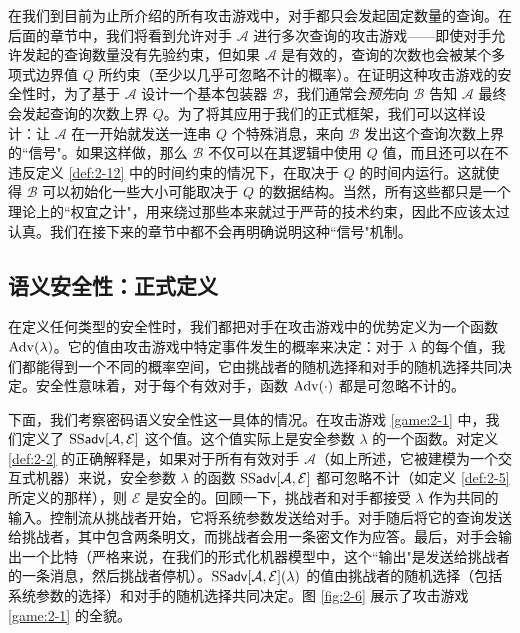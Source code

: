 \begin{snote}[查询有界的对手。]
在我们到目前为止所介绍的所有攻击游戏中，对手都只会发起固定数量的查询。在后面的章节中，我们将看到允许对手 $\mathcal{A}$ 进行多次查询的攻击游戏——即使对手允许发起的查询数量没有先验约束，但如果 $\mathcal{A}$ 是有效的，查询的次数也会被某个多项式边界值 $Q$ 所约束（至少以几乎可忽略不计的概率）。在证明这种攻击游戏的安全性时，为了基于 $\mathcal{A}$ 设计一个基本包装器 $\mathcal{B}$，我们通常会\emph{预先}向 $\mathcal{B}$ 告知 $\mathcal{A}$ 最终会发起查询的次数上界 $Q$。为了将其应用于我们的正式框架，我们可以这样设计：让 $\mathcal{A}$ 在一开始就发送一连串 $Q$ 个特殊消息，来向 $\mathcal{B}$ 发出这个查询次数上界的``信号"。如果这样做，那么 $\mathcal{B}$ 不仅可以在其逻辑中使用 $Q$ 值，而且还可以在不违反定义 \ref{def:2-12} 中的时间约束的情况下，在取决于 $Q$ 的时间内运行。这就使得 $\mathcal{B}$ 可以初始化一些大小可能取决于 $Q$ 的数据结构。当然，所有这些都只是一个理论上的``权宜之计"，用来绕过那些本来就过于严苛的技术约束，因此不应该太过认真。我们在接下来的章节中都不会再明确说明这种``信号"机制。
\end{snote}


\subsection{语义安全性：正式定义}\label{subsec:2-3-4}

在定义任何类型的安全性时，我们都把对手在攻击游戏中的优势定义为一个函数 ${\rm Adv}(\lambda)$。它的值由攻击游戏中特定事件发生的概率来决定：对于 $\lambda$ 的每个值，我们都能得到一个不同的概率空间，它由挑战者的随机选择和对手的随机选择共同决定。安全性意味着，对于每个有效对手，函数 ${\rm Adv}(\cdot)$ 都是可忽略不计的。

下面，我们考察密码语义安全性这一具体的情况。在攻击游戏 \ref{game:2-1} 中，我们定义了 ${\rm SS\mathsf{adv}}[\mathcal{A},\mathcal{E}]$ 这个值。这个值实际上是安全参数 $\lambda$ 的一个函数。对定义 \ref{def:2-2} 的正确解释是，如果对于所有有效对手 $\mathcal{A}$（如上所述，它被建模为一个交互式机器）来说，安全参数 $\lambda$ 的函数 ${\rm SS\mathsf{adv}}[\mathcal{A},\mathcal{E}]$ 都可忽略不计（如定义 \ref{def:2-5} 所定义的那样），则 $\mathcal{E}$ 是安全的。回顾一下，挑战者和对手都接受 $\lambda$ 作为共同的输入。控制流从挑战者开始，它将系统参数发送给对手。对手随后将它的查询发送给挑战者，其中包含两条明文，而挑战者会用一条密文作为应答。最后，对手会输出一个比特（严格来说，在我们的形式化机器模型中，这个``输出"是发送给挑战者的一条消息，然后挑战者停机）。${\rm SS\mathsf{adv}}[\mathcal{A},\mathcal{E}](\lambda)$ 的值由挑战者的随机选择（包括系统参数的选择）和对手的随机选择共同决定。图 \ref{fig:2-6} 展示了攻击游戏 \ref{game:2-1} 的全貌。

